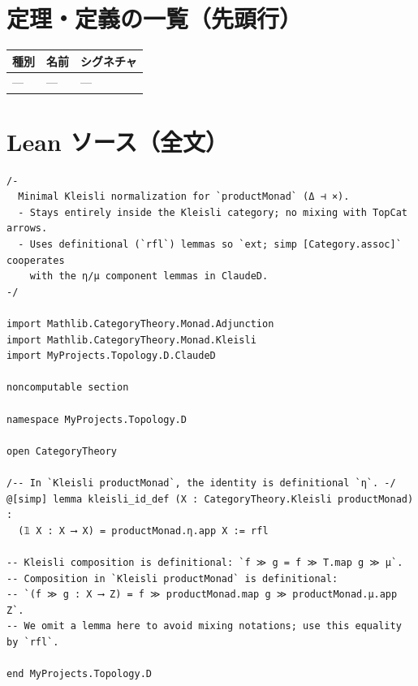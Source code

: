 \documentclass[12pt]{article}
\theoremstyle{definition}
\begin{document}
\section*{定理・定義の一覧（先頭行）}
\begin{center}
\begin{tabular}{lll}
\textbf{種別} & \textbf{名前} & \textbf{シグネチャ} \\ \hline
— & — & — \\
\end{tabular}
\end{center}

\section*{Lean ソース（全文）}
\begin{lstlisting}
/-
  Minimal Kleisli normalization for `productMonad` (Δ ⊣ ×).
  - Stays entirely inside the Kleisli category; no mixing with TopCat arrows.
  - Uses definitional (`rfl`) lemmas so `ext; simp [Category.assoc]` cooperates
    with the η/μ component lemmas in ClaudeD.
-/

import Mathlib.CategoryTheory.Monad.Adjunction
import Mathlib.CategoryTheory.Monad.Kleisli
import MyProjects.Topology.D.ClaudeD

noncomputable section

namespace MyProjects.Topology.D

open CategoryTheory

/-- In `Kleisli productMonad`, the identity is definitional `η`. -/
@[simp] lemma kleisli_id_def (X : CategoryTheory.Kleisli productMonad) :
  (𝟙 X : X ⟶ X) = productMonad.η.app X := rfl

-- Kleisli composition is definitional: `f ≫ g = f ≫ T.map g ≫ μ`.
-- Composition in `Kleisli productMonad` is definitional:
-- `(f ≫ g : X ⟶ Z) = f ≫ productMonad.map g ≫ productMonad.μ.app Z`.
-- We omit a lemma here to avoid mixing notations; use this equality by `rfl`.

end MyProjects.Topology.D

\end{lstlisting}
\end{document}
